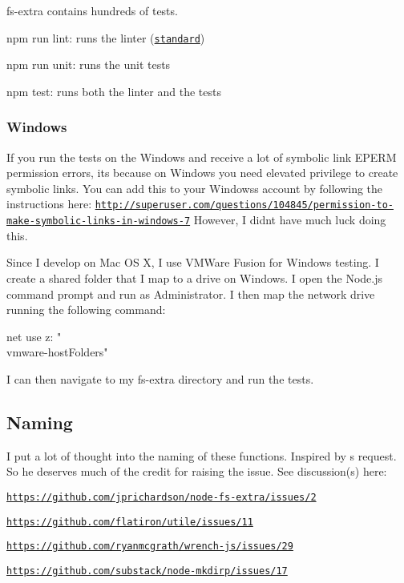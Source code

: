 fs-\/extra contains hundreds of tests.


\begin{DoxyItemize}
\item {\ttfamily npm run lint}\+: runs the linter (\href{http://standardjs.com/}{\tt standard})
\item {\ttfamily npm run unit}\+: runs the unit tests
\item {\ttfamily npm test}\+: runs both the linter and the tests
\end{DoxyItemize}

\subsubsection*{Windows}

If you run the tests on the Windows and receive a lot of symbolic link {\ttfamily E\+P\+E\+RM} permission errors, it\textquotesingle{}s because on Windows you need elevated privilege to create symbolic links. You can add this to your Windows\textquotesingle{}s account by following the instructions here\+: \href{http://superuser.com/questions/104845/permission-to-make-symbolic-links-in-windows-7}{\tt http\+://superuser.\+com/questions/104845/permission-\/to-\/make-\/symbolic-\/links-\/in-\/windows-\/7} However, I didn\textquotesingle{}t have much luck doing this.

Since I develop on Mac OS X, I use V\+M\+Ware Fusion for Windows testing. I create a shared folder that I map to a drive on Windows. I open the {\ttfamily Node.\+js command prompt} and run as {\ttfamily Administrator}. I then map the network drive running the following command\+: \begin{DoxyVerb}net use z: "\\vmware-host\Shared Folders"
\end{DoxyVerb}


I can then navigate to my {\ttfamily fs-\/extra} directory and run the tests.

\subsection*{Naming }

I put a lot of thought into the naming of these functions. Inspired by \textquotesingle{}s request. So he deserves much of the credit for raising the issue. See discussion(s) here\+:


\begin{DoxyItemize}
\item \href{https://github.com/jprichardson/node-fs-extra/issues/2}{\tt https\+://github.\+com/jprichardson/node-\/fs-\/extra/issues/2}
\item \href{https://github.com/flatiron/utile/issues/11}{\tt https\+://github.\+com/flatiron/utile/issues/11}
\item \href{https://github.com/ryanmcgrath/wrench-js/issues/29}{\tt https\+://github.\+com/ryanmcgrath/wrench-\/js/issues/29}
\item \href{https://github.com/substack/node-mkdirp/issues/17}{\tt https\+://github.\+com/substack/node-\/mkdirp/issues/17}
\end{DoxyItemize}

